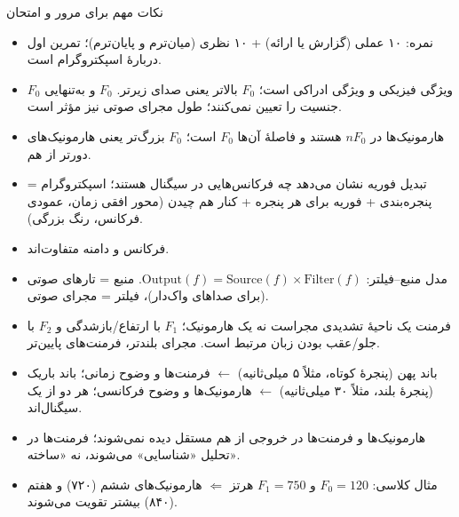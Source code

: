 \begin{exambox}{نکات مهم برای مرور و امتحان}
\begin{itemize}
  \item نمره: ۱۰ عملی (گزارش یا ارائه) + ۱۰ نظری (میان‌ترم و پایان‌ترم)؛ تمرین اول دربارهٔ اسپکتروگرام است.
  \item $F_0$ ویژگی فیزیکی و  ویژگی ادراکی است؛ $F_0$ بالاتر یعنی صدای زیرتر. $F_0$ و  به‌تنهایی جنسیت را تعیین نمی‌کنند؛ طول مجرای صوتی نیز مؤثر است.
  \item هارمونیک‌ها در $nF_0$ هستند و فاصلهٔ آن‌ها $F_0$ است؛ $F_0$ بزرگ‌تر یعنی هارمونیک‌های دورتر از هم.
  \item تبدیل فوریه نشان می‌دهد چه فرکانس‌هایی در سیگنال هستند؛ اسپکتروگرام = پنجره‌بندی + فوریه برای هر پنجره + کنار هم چیدن (محور افقی زمان، عمودی فرکانس، رنگ بزرگی).
  \item فرکانس و دامنه متفاوت‌اند.
  \item مدل منبع--فیلتر: $\text{Output}(f)=\text{Source}(f)\times\text{Filter}(f)$. منبع = تارهای صوتی (برای صداهای واک‌دار)، فیلتر = مجرای صوتی.
  \item فرمنت یک ناحیهٔ تشدیدی مجراست نه یک هارمونیک؛ $F_1$ با ارتفاع/بازشدگی و $F_2$ با جلو/عقب بودن زبان مرتبط است. مجرای بلندتر، فرمنت‌های پایین‌تر.
  \item باند پهن (پنجرهٔ کوتاه، مثلاً ۵ میلی‌ثانیه) $\leftarrow$ فرمنت‌ها و وضوح زمانی؛ باند باریک (پنجرهٔ بلند، مثلاً ۳۰ میلی‌ثانیه) $\leftarrow$ هارمونیک‌ها و وضوح فرکانسی؛ هر دو از یک سیگنال‌اند.
  \item هارمونیک‌ها و فرمنت‌ها در خروجی از هم مستقل دیده نمی‌شوند؛ فرمنت‌ها در تحلیل «شناسایی» می‌شوند، نه «ساخته».
  \item مثال کلاسی: $F_0=120$ و $F_1=750$ هرتز $\Leftarrow$ هارمونیک‌های ششم (۷۲۰) و هفتم (۸۴۰) بیشتر تقویت می‌شوند.
\end{itemize}
\end{exambox}
